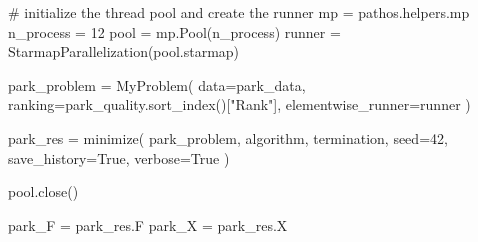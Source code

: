 \documentclass[
  authoryear,
  preprint,
  3p]{elsarticle}
\newenvironment{Shaded}{\begin{snugshade}}{\end{snugshade}}
\newcommand{\CommentTok}[1]{\textcolor[rgb]{0.37,0.37,0.37}{#1}}
\newcommand{\DecValTok}[1]{\textcolor[rgb]{0.68,0.00,0.00}{#1}}
\newcommand{\NormalTok}[1]{\textcolor[rgb]{0.00,0.23,0.31}{#1}}
\newcommand{\OperatorTok}[1]{\textcolor[rgb]{0.37,0.37,0.37}{#1}}
\newcommand{\StringTok}[1]{\textcolor[rgb]{0.13,0.47,0.30}{#1}}
\newcommand{\VariableTok}[1]{\textcolor[rgb]{0.07,0.07,0.07}{#1}}
\begin{document}
\begin{Shaded}
\begin{Highlighting}[]
\CommentTok{\# initialize the thread pool and create the runner}
\NormalTok{mp }\OperatorTok{=}\NormalTok{ pathos.helpers.mp}
\NormalTok{n\_process }\OperatorTok{=} \DecValTok{12}
\NormalTok{pool }\OperatorTok{=}\NormalTok{ mp.Pool(n\_process)}
\NormalTok{runner }\OperatorTok{=}\NormalTok{ StarmapParallelization(pool.starmap)}

\NormalTok{park\_problem }\OperatorTok{=}\NormalTok{ MyProblem(}
\NormalTok{    data}\OperatorTok{=}\NormalTok{park\_data, ranking}\OperatorTok{=}\NormalTok{park\_quality.sort\_index()[}\StringTok{"Rank"}\NormalTok{], elementwise\_runner}\OperatorTok{=}\NormalTok{runner}
\NormalTok{)}

\NormalTok{park\_res }\OperatorTok{=}\NormalTok{ minimize(}
\NormalTok{    park\_problem, algorithm, termination, seed}\OperatorTok{=}\DecValTok{42}\NormalTok{, save\_history}\OperatorTok{=}\VariableTok{True}\NormalTok{, verbose}\OperatorTok{=}\VariableTok{True}
\NormalTok{)}

\NormalTok{pool.close()}

\NormalTok{park\_F }\OperatorTok{=}\NormalTok{ park\_res.F}
\NormalTok{park\_X }\OperatorTok{=}\NormalTok{ park\_res.X}
\end{Highlighting}
\end{Shaded}
\end{document}
